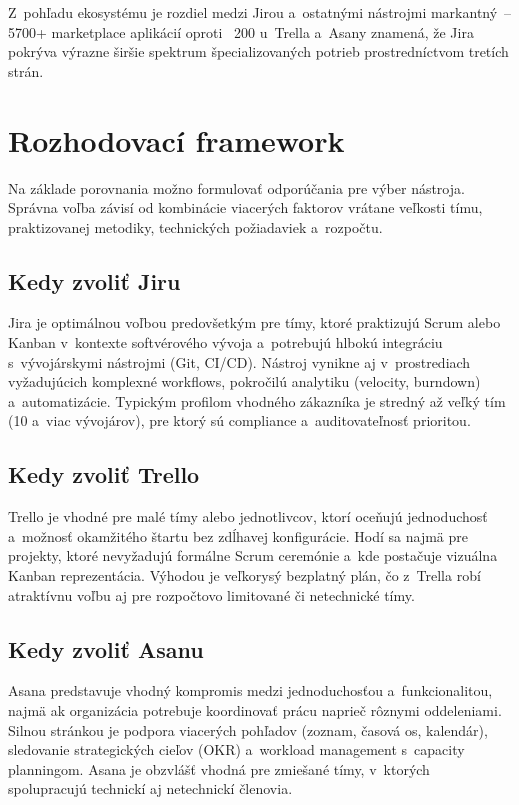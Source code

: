 Z~pohľadu ekosystému je rozdiel medzi Jirou a~ostatnými nástrojmi markantný~-- 5700+ marketplace aplikácií oproti ~200 u~Trella a~Asany znamená, že Jira pokrýva výrazne širšie spektrum špecializovaných potrieb prostredníctvom tretích strán.

\section{Rozhodovací framework}

Na základe porovnania možno formulovať odporúčania pre výber nástroja. Správna voľba závisí od kombinácie viacerých faktorov vrátane veľkosti tímu, praktizovanej metodiky, technických požiadaviek a~rozpočtu.

\subsection{Kedy zvoliť Jiru}

Jira je optimálnou voľbou predovšetkým pre tímy, ktoré praktizujú Scrum alebo Kanban v~kontexte softvérového vývoja a~potrebujú hlbokú integráciu s~vývojárskymi nástrojmi (Git, CI/CD). Nástroj vynikne aj v~prostrediach vyžadujúcich komplexné workflows, pokročilú analytiku (velocity, burndown) a~automatizácie. Typickým profilom vhodného zákazníka je stredný až veľký tím (10 a~viac vývojárov), pre ktorý sú compliance a~auditovateľnosť prioritou.

\subsection{Kedy zvoliť Trello}

Trello je vhodné pre malé tímy alebo jednotlivcov, ktorí oceňujú jednoduchosť a~možnosť okamžitého štartu bez zdĺhavej konfigurácie. Hodí sa najmä pre projekty, ktoré nevyžadujú formálne Scrum ceremónie a~kde postačuje vizuálna Kanban reprezentácia. Výhodou je veľkorysý bezplatný plán, čo z~Trella robí atraktívnu voľbu aj pre rozpočtovo limitované či netechnické tímy.

\subsection{Kedy zvoliť Asanu}

Asana predstavuje vhodný kompromis medzi jednoduchosťou a~funkcionalitou, najmä ak organizácia potrebuje koordinovať prácu naprieč rôznymi oddeleniami. Silnou stránkou je podpora viacerých pohľadov (zoznam, časová os, kalendár), sledovanie strategických cieľov (OKR) a~workload management s~capacity planningom. Asana je obzvlášť vhodná pre zmiešané tímy, v~ktorých spolupracujú technickí aj netechnickí členovia.

